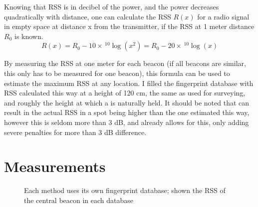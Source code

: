 Knowing that RSS is in decibel of the power, and the power decreases quadratically with distance, one can calculate the RSS $R(x)$ for a radio signal in empty space at distance x from the transmitter, if the RSS at 1 meter distance $R_0$ is known.
\begin{equation}
    R(x) = R_0 - 10 \times \, ^{10}\log(x^2) = R_0 - 20 \times \, ^{10}\log(x)
\end{equation}

By measuring the RSS at one meter for each beacon (if all beacons are similar, this only has to be measured for one beacon), this formula can be used to estimate the maximum RSS at any location.
I filled the fingerprint database with RSS calculated this way at a height of 120 cm, the same as used for surveying, and roughly the height at which a \device is naturally held.
It should be noted that \mpp can result in the actual RSS in a spot being higher than the one estimated this way, however this is seldom more than 3 dB, and  already allows for this, only adding severe penalties for more than 3 dB difference.

\section{Measurements}
\begin{figure}[p]
    \begin{subfigure}[b]{0.5\textwidth}
    \end{subfigure}
    \begin{subfigure}[b]{0.5\textwidth}
    \end{subfigure}
    \begin{subfigure}[b]{0.5\textwidth}
    \end{subfigure}
    \begin{subfigure}[b]{0.5\textwidth}
    \end{subfigure}
    \begin{subfigure}[b]{0.5\textwidth}
    \end{subfigure}
    \begin{subfigure}[b]{0.5\textwidth}
    \end{subfigure}
    \caption{Each method uses its own fingerprint database; shown the RSS of the central beacon in each database}
    \label{fig:architecture-heatmaps}
\end{figure}

